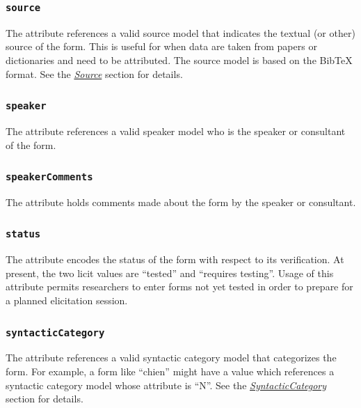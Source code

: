 \documentclass[letterpaper,10pt,english]{sphinxmanual}
\begin{document}
\subsubsection{\texttt{source}}
\label{datastructure:id25}
The  attribute references a valid source model that indicates the
textual (or other) source of the form.  This is useful for when data are taken
from papers or dictionaries and need to be attributed.  The source model is
based on the BibTeX format. See the {\hyperref[datastructure:source-data-structure]{\emph{Source}}} section for
details.


\subsubsection{\texttt{speaker}}
\label{datastructure:id26}
The  attribute references a valid speaker model who is the speaker or
consultant of the form.


\subsubsection{\texttt{speakerComments}}
\label{datastructure:speakercomments}
The  attribute holds comments made about the form by the
speaker or consultant.


\subsubsection{\texttt{status}}
\label{datastructure:status}
The  attribute encodes the status of the form with respect to its
verification.  At present, the two licit values are ``tested'' and ``requires
testing''.  Usage of this attribute permits researchers to enter forms not yet
tested in order to prepare for a planned elicitation session.


\subsubsection{\texttt{syntacticCategory}}
\label{datastructure:syntacticcategory}
The  attribute references a valid syntactic category model
that categorizes the form.  For example, a form like ``chien'' might have a
 value which references a syntactic category model whose
 attribute is ``N''.  See the {\hyperref[datastructure:syntactic-category-data-structure]{\emph{SyntacticCategory}}}
section for details.
\end{document}

